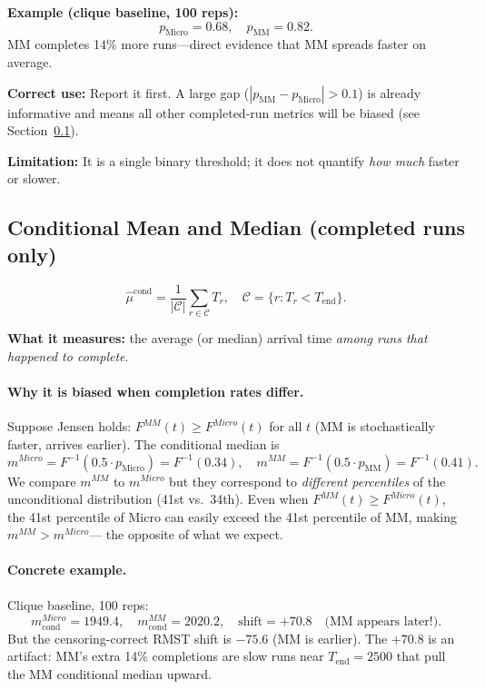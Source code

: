\documentclass[11pt,a4paper]{article}
\begin{document}
\textbf{Example (clique baseline, 100 reps):}
\[
  p_{\mathrm{Micro}} = 0.68,\quad p_{\mathrm{MM}} = 0.82.
\]
MM completes 14\% more runs---direct evidence that MM spreads faster on average.

\textbf{Correct use:} Report it first.  A large gap ($|p_{\mathrm{MM}} -
p_{\mathrm{Micro}}| > 0.1$) is already informative and means all other
completed-run metrics will be biased (see Section~\ref{sec:bias}).

\textbf{Limitation:} It is a single binary threshold; it does not quantify
\emph{how much} faster or slower.

\subsection{Conditional Mean and Median (completed runs only)}
\label{sec:bias}

\[
  \hat\mu^{\mathrm{cond}} = \frac{1}{|\mathcal{C}|}\sum_{r\in\mathcal{C}} T_r,
  \quad
  \mathcal{C} = \{r : T_r < T_{\mathrm{end}}\}.
\]

\textbf{What it measures:} the average (or median) arrival time
\emph{among runs that happened to complete}.

\paragraph{Why it is biased when completion rates differ.}
Suppose Jensen holds: $F^{MM}(t) \geq F^{Micro}(t)$ for all $t$
(MM is stochastically faster, arrives earlier).  The conditional median is
\[
  m^{Micro} = F^{-1}(0.5 \cdot p_{\mathrm{Micro}})
             = F^{-1}(0.34),
  \quad
  m^{MM}    = F^{-1}(0.5 \cdot p_{\mathrm{MM}})
             = F^{-1}(0.41).
\]
We compare $m^{MM}$ to $m^{Micro}$ but they correspond to \emph{different
percentiles} of the unconditional distribution (41st vs.\ 34th).
Even when $F^{MM}(t) \geq F^{Micro}(t)$, the 41st percentile of Micro can
easily exceed the 41st percentile of MM, making $m^{MM} > m^{Micro}$---
the opposite of what we expect.

\paragraph{Concrete example.}
Clique baseline, 100 reps:
\[
  m_{\mathrm{cond}}^{Micro} = 1949.4,\quad
  m_{\mathrm{cond}}^{MM}    = 2020.2,\quad
  \text{shift} = +70.8 \quad \text{(MM appears later!)}.
\]
But the censoring-correct RMST shift is $-75.6$ (MM is earlier).
The $+70.8$ is an artifact: MM's extra 14\% completions are slow runs near
$T_{\mathrm{end}} = 2500$ that pull the MM conditional median upward.
\end{document}
